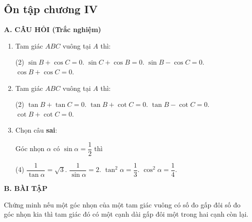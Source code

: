 \begin{practice}
    \subsection{Ôn tập chương IV}

    \textbf{A. CÂU HỎI (Trắc nghiệm)}

    \begin{enumerate}[label=\arabic*.]
        \item Tam giác $ABC$ vuông tại $A$ thì:
        \begin{tasks}(2)
            \task $\sin B+\cos C=0$.
            \task $\sin C+\cos B=0$.
            \task $\sin B-\cos C=0$.
            \task $\cos B+\cos C=0$.
        \end{tasks}
        \par\noindent\answerbox\par

        \item Tam giác $ABC$ vuông tại $A$ thì:
        \begin{tasks}(2)
            \task $\tan B+\tan C=0$.
            \task $\tan B+\cot C=0$.
            \task $\tan B-\cot C=0$.
            \task $\cot B+\cot C=0$.
        \end{tasks}
        \par\noindent\answerbox\par

        \item Chọn câu \textbf{sai}:

        Góc nhọn $\alpha$ có $\sin\alpha=\dfrac{1}{2}$ thì
        \begin{tasks}(4)
            \task $\dfrac{1}{\tan\alpha}=\sqrt{3}$.
            \task $\dfrac{1}{\sin\alpha}=2$.
            \task $\tan^2\alpha=\dfrac{1}{3}$.
            \task $\cos^2\alpha=\dfrac{1}{4}$.
        \end{tasks}
        \par\noindent\answerbox\par
    \end{enumerate}

    \textbf{B. BÀI TẬP}

    \begin{questions}[resume=SBT]
        \item Chứng minh nếu một góc nhọn của một tam giác vuông có số đo gấp đôi số đo góc nhọn kia thì tam giác đó có một cạnh dài gấp đôi một trong hai cạnh còn lại.

        \answerline
        \answerline
        \answerline


\end{questions}
\end{practice}

